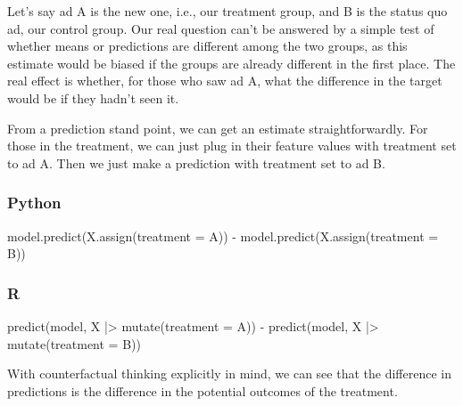 \documentclass[
  letterpaper,
]{krantz}
\newenvironment{Shaded}{}{}
\newcommand{\AttributeTok}[1]{\textcolor[rgb]{0.49,0.56,0.16}{#1}}
\newcommand{\FunctionTok}[1]{\textcolor[rgb]{0.02,0.16,0.49}{#1}}
\newcommand{\NormalTok}[1]{#1}
\newcommand{\OperatorTok}[1]{\textcolor[rgb]{0.40,0.40,0.40}{#1}}
\newcommand{\SpecialCharTok}[1]{\textcolor[rgb]{0.25,0.44,0.63}{#1}}
\newcommand{\StringTok}[1]{\textcolor[rgb]{0.25,0.44,0.63}{#1}}
\begin{document}
Let's say ad A is the new one, i.e., our treatment group, and B is the
status quo ad, our control group. Our real question can't be answered by
a simple test of whether means or predictions are different among the
two groups, as this estimate would be biased if the groups are already
different in the first place. The real effect is whether, for those who
saw ad A, what the difference in the target would be if they hadn't seen
it.

From a prediction stand point, we can get an estimate straightforwardly.
For those in the treatment, we can just plug in their feature values
with treatment set to ad A. Then we just make a prediction with
treatment set to ad B.

\subsubsection{Python}

\begin{Shaded}
\begin{Highlighting}[]
\NormalTok{model.predict(X.assign(treatment }\OperatorTok{=} \StringTok{\textquotesingle{}A\textquotesingle{}}\NormalTok{)) }\OperatorTok{{-}} 
\NormalTok{    model.predict(X.assign(treatment }\OperatorTok{=} \StringTok{\textquotesingle{}B\textquotesingle{}}\NormalTok{))}
\end{Highlighting}
\end{Shaded}

\subsubsection{R}

\begin{Shaded}
\begin{Highlighting}[]
\FunctionTok{predict}\NormalTok{(model, X }\SpecialCharTok{|\textgreater{}} \FunctionTok{mutate}\NormalTok{(}\AttributeTok{treatment =} \StringTok{\textquotesingle{}A\textquotesingle{}}\NormalTok{)) }\SpecialCharTok{{-}} 
    \FunctionTok{predict}\NormalTok{(model, X }\SpecialCharTok{|\textgreater{}} \FunctionTok{mutate}\NormalTok{(}\AttributeTok{treatment =} \StringTok{\textquotesingle{}B\textquotesingle{}}\NormalTok{))}
\end{Highlighting}
\end{Shaded}

With counterfactual thinking explicitly in mind, we can see that the
difference in predictions is the difference in the potential outcomes of
the treatment.
\end{document}
